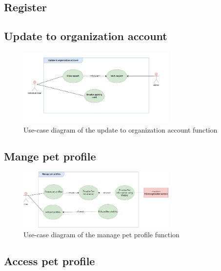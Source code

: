 

\subsection{Register}



\subsection{Update to organization account}

\begin{figure}[H]
  \centering
  \includegraphics[width=0.7\textwidth]{Figures/update_org_ucd.png}
  \caption{Use-case diagram of the update to organization account function}
  \label{fig:update-org_activity_diagram}
\end{figure}



\subsection{Mange pet profile}

\begin {figure}[H]
\centering
\includegraphics[width=0.7\textwidth]{Figures/manage_pet_ucd.png}
\caption{Use-case diagram of the manage pet profile function}
\label{fig:manage-pet-activity-diagram}
\end{figure}



\subsection{Access pet profile}

